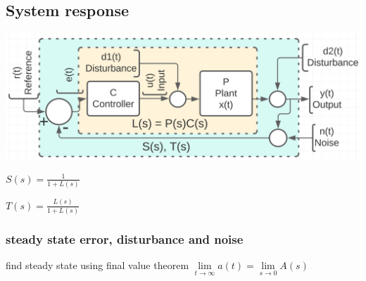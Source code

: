 \subsection{System response}
    \includegraphics[width = \linewidth]{src/images/basic_block_chart.png}
    \begin{minipage}{0.49\linewidth}
        \begin{center}
            $S(s) = \frac{1}{1 + L(s)}$
        \end{center}
    \end{minipage}
    \begin{minipage}{0.49\linewidth}
        \begin{center}
            $T(s) = \frac{L(s)}{1 + L(s)}$
        \end{center}
    \end{minipage}
    
    \subsubsection{steady state error, disturbance and noise}
    find steady state using final value theorem $\lim\limits_{t \rightarrow \infty} a(t) = \lim\limits_{s \rightarrow 0} A(s)$

